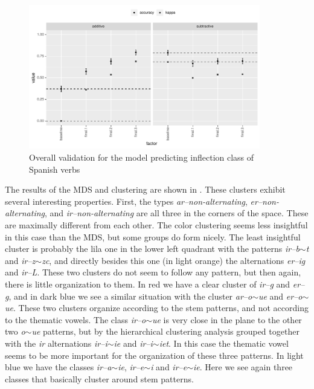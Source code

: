 \begin{figure}
  \includegraphics[width=0.9\textwidth]{./figures/spanish/p-fi-mini-overall.pdf}
  \caption{Overall validation  for the model predicting inflection class of Spanish verbs}
  \label{fig:overall-sp-verbs}
\end{figure}


The results of the MDS and clustering are shown in . These clusters exhibit several interesting properties. First, the types \textit{ar--non-alternating}, \textit{er--non-alternating}, and \textit{ir--non-alternating} are all three in the corners of the space. These are maximally different from each other. The color clustering seems less insightful in this case than the MDS, but some groups do form nicely. The least insightful cluster is probably the lila one in the lower left quadrant with the patterns \textit{ir--b$\sim$t} and \textit{ir--z$\sim$zc}, and directly besides this one (in light orange) the alternations \textit{er--ig} and \textit{ir--L}. These two clusters do not seem to follow any pattern, but then again, there is little organization to them. In red we have a clear cluster of \textit{ir--g} and \textit{er--g}, and in dark blue we see a similar situation with the cluster \textit{ar--o$\sim$ue} and \textit{er--o$\sim$ue}. These two clusters organize according to the stem patterns, and not according to the thematic vowels. The class \textit{ir--o$\sim$ue} is very close in the plane to the other two \textit{o$\sim$ue} patterns, but by the hierarchical clustering analysis grouped together with the \textit{ir} alternations \textit{ir--i$\sim$ie} and \textit{ir--i$\sim$iet}. In this case the thematic vowel seems to be more important for the organization of these three patterns. In light blue we have the classes \textit{ir--a$\sim$ie}, \textit{ir--e$\sim$i} and \textit{ir--e$\sim$ie}. Here we see again three classes that basically cluster around stem patterns.

